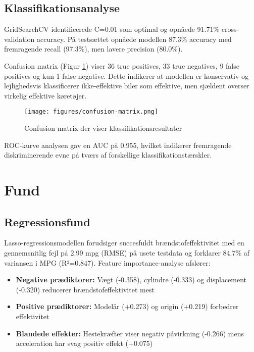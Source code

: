 \documentclass[a4paper, twocolumn]{article}
\begin{document}
\subsection{Klassifikationsanalyse}
GridSearchCV identificerede C=0.01 som optimal og opnåede 91.71\% cross-validation accuracy. På testsættet opnåede modellen 87.3\% accuracy med fremragende recall (97.3\%), men lavere precision (80.0\%).

Confusion matrix (Figur \ref{fig:confusion}) viser 36 true positives, 33 true negatives, 9 false positives og kun 1 false negative. Dette indikerer at modellen er konservativ og lejlighedsvis klassificerer ikke-effektive biler som effektive, men sjældent overser virkelig effektive køretøjer.

\begin{figure}[h]
    \centering
    \texttt{[image: figures/confusion-matrix.png]}
    \caption{Confusion matrix der viser klassifikationsresultater}
    \label{fig:confusion}
\end{figure}

ROC-kurve analysen gav en AUC på 0.955, hvilket indikerer fremragende diskriminerende evne på tværs af forskellige klassifikationstærskler.

\section{Fund}
\label{sec:findings}

\subsection{Regressionsfund}
Lasso-regressionsmodellen forudsiger succesfuldt brændstofeffektivitet med en gennemsnitlig fejl på 2.99 mpg (RMSE) på usete testdata og forklarer 84.7\% af variansen i MPG (R²=0.847). Feature importance-analyse afslører:

\begin{itemize}
\item \textbf{Negative prædiktorer:} Vægt (-0.358), cylindre (-0.333) og displacement (-0.320) reducerer brændstofeffektivitet mest
\item \textbf{Positive prædiktorer:} Modelår (+0.273) og origin (+0.219) forbedrer effektivitet
\item \textbf{Blandede effekter:} Hestekræfter viser negativ påvirkning (-0.266) mens acceleration har svag positiv effekt (+0.075)
\end{itemize}
\end{document}

